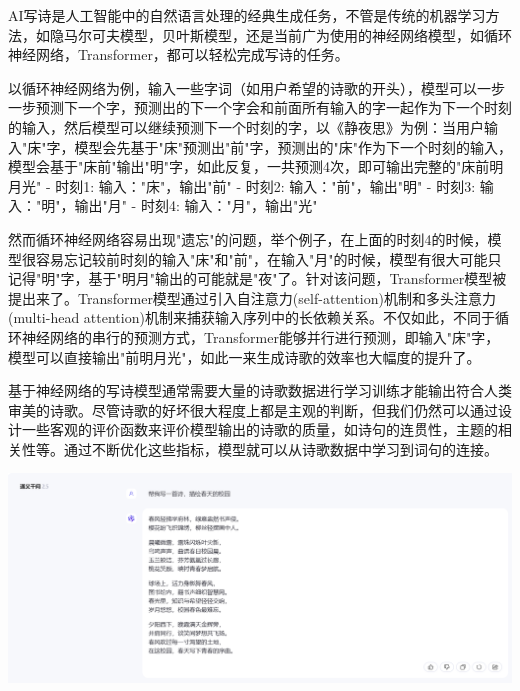 AI写诗是人工智能中的自然语言处理的经典生成任务，不管是传统的机器学习方法，如隐马尔可夫模型，贝叶斯模型，还是当前广为使用的神经网络模型，如循环神经网络，Transformer，都可以轻松完成写诗的任务。

以循环神经网络为例，输入一些字词（如用户希望的诗歌的开头），模型可以一步一步预测下一个字，预测出的下一个字会和前面所有输入的字一起作为下一个时刻的输入，然后模型可以继续预测下一个时刻的字，以《静夜思》为例：当用户输入"床"字，模型会先基于"床"预测出"前"字，预测出的"床"作为下一个时刻的输入，模型会基于"床前"输出"明"字，如此反复，一共预测4次，即可输出完整的"床前明月光"
- 时刻1: 输入："床"，输出"前"
- 时刻2: 输入："前"，输出"明"
- 时刻3: 输入："明"，输出"月"
- 时刻4: 输入："月"，输出"光"

然而循环神经网络容易出现"遗忘"的问题，举个例子，在上面的时刻4的时候，模型很容易忘记较前时刻的输入"床"和"前"，在输入"月"的时候，模型有很大可能只记得"明"字，基于"明月"输出的可能就是"夜"了。针对该问题，Transformer模型被提出来了。Transformer模型通过引入自注意力(self-attention)机制和多头注意力(multi-head attention)机制来捕获输入序列中的长依赖关系。不仅如此，不同于循环神经网络的串行的预测方式，Transformer能够并行进行预测，即输入"床"字，模型可以直接输出"前明月光"，如此一来生成诗歌的效率也大幅度的提升了。

基于神经网络的写诗模型通常需要大量的诗歌数据进行学习训练才能输出符合人类审美的诗歌。尽管诗歌的好坏很大程度上都是主观的判断，但我们仍然可以通过设计一些客观的评价函数来评价模型输出的诗歌的质量，如诗句的连贯性，主题的相关性等。通过不断优化这些指标，模型就可以从诗歌数据中学习到词句的连接。

\begin{marginfigure}
\includegraphics{images/Internet_10.png}
\end{marginfigure}

